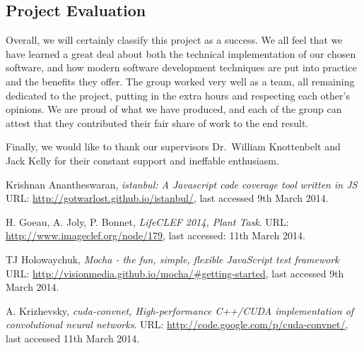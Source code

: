 \documentclass[a4paper,11pt]{article}
\begin{document}
\begin{description}
\subsection{Project Evaluation}

Overall, we will certainly classify this project as a success. We all feel that we have learned a great deal about both the technical implementation of our chosen software, and how modern software development techniques are put into practice and the benefits they offer. The group worked very well as a team, all remaining dedicated to the project, putting in the extra hours and respecting each other's opinions. We are proud of what we have produced, and each of the group can attest that they contributed their fair share of work to the end result. 

\hspace{5 mm} Finally, we would like to thank our supervisors Dr.\ William Knottenbelt and Jack Kelly for their constant support and ineffable enthusiasm.





\clearpage

\begin{thebibliography}{1}


 Krishnan Anantheswaran,
  \emph{istanbul: A Javascript code coverage tool written in JS}\\
 URL: \url{http://gotwarlost.github.io/istanbul/}, last accessed 9th March 2014.

  H. Goeau, A. Joly, P. Bonnet,
  \emph{LifeCLEF 2014,  Plant Task}.
 URL: \url{http://www.imageclef.org/node/179}, last accessed: 11th March 2014.

 TJ Holowaychuk,
  \emph{Mocha - the fun, simple, flexible JavaScript test framework}\\
 URL: \url{http://visionmedia.github.io/mocha/#getting-started}, last accessed 9th March 2014. 

 A. Krizhevsky,
  \emph{cuda-convnet, High-performance C++/CUDA implementation of convolutional neural networks}.
 URL: \url{http://code.google.com/p/cuda-convnet/}, last accessed 11th March 2014.


\end{thebibliography}
\end{description}
\end{document}
